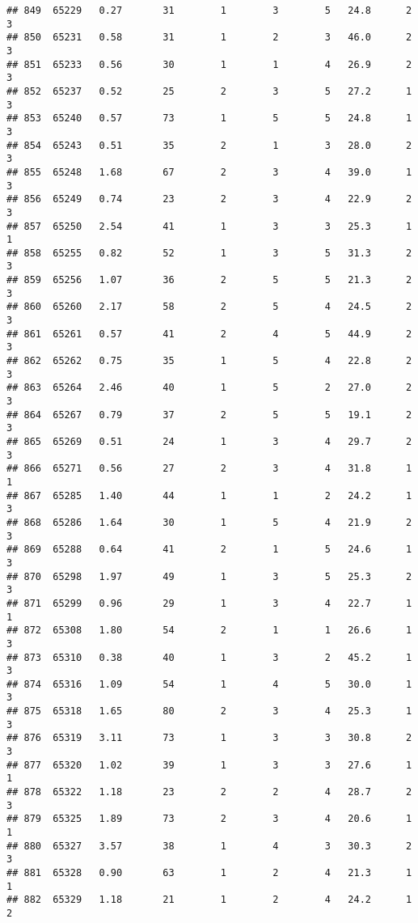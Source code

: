 \documentclass[
]{article}
\begin{document}
\begin{verbatim}
## 849  65229   0.27       31        1        3        5   24.8      2      3
## 850  65231   0.58       31        1        2        3   46.0      2      3
## 851  65233   0.56       30        1        1        4   26.9      2      3
## 852  65237   0.52       25        2        3        5   27.2      1      3
## 853  65240   0.57       73        1        5        5   24.8      1      3
## 854  65243   0.51       35        2        1        3   28.0      2      3
## 855  65248   1.68       67        2        3        4   39.0      1      3
## 856  65249   0.74       23        2        3        4   22.9      2      3
## 857  65250   2.54       41        1        3        3   25.3      1      1
## 858  65255   0.82       52        1        3        5   31.3      2      3
## 859  65256   1.07       36        2        5        5   21.3      2      3
## 860  65260   2.17       58        2        5        4   24.5      2      3
## 861  65261   0.57       41        2        4        5   44.9      2      3
## 862  65262   0.75       35        1        5        4   22.8      2      3
## 863  65264   2.46       40        1        5        2   27.0      2      3
## 864  65267   0.79       37        2        5        5   19.1      2      3
## 865  65269   0.51       24        1        3        4   29.7      2      3
## 866  65271   0.56       27        2        3        4   31.8      1      1
## 867  65285   1.40       44        1        1        2   24.2      1      3
## 868  65286   1.64       30        1        5        4   21.9      2      3
## 869  65288   0.64       41        2        1        5   24.6      1      3
## 870  65298   1.97       49        1        3        5   25.3      2      3
## 871  65299   0.96       29        1        3        4   22.7      1      1
## 872  65308   1.80       54        2        1        1   26.6      1      3
## 873  65310   0.38       40        1        3        2   45.2      1      3
## 874  65316   1.09       54        1        4        5   30.0      1      3
## 875  65318   1.65       80        2        3        4   25.3      1      3
## 876  65319   3.11       73        1        3        3   30.8      2      3
## 877  65320   1.02       39        1        3        3   27.6      1      1
## 878  65322   1.18       23        2        2        4   28.7      2      3
## 879  65325   1.89       73        2        3        4   20.6      1      1
## 880  65327   3.57       38        1        4        3   30.3      2      3
## 881  65328   0.90       63        1        2        4   21.3      1      1
## 882  65329   1.18       21        1        2        4   24.2      1      2

\end{verbatim}
\end{document}
